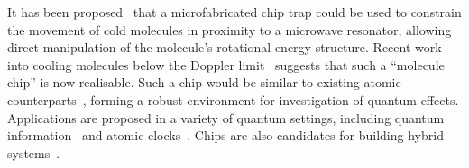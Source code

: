 
It has been proposed~\cite{Andre2006} that a microfabricated chip trap could be
used to constrain the movement of cold molecules in proximity to a microwave
resonator, allowing direct manipulation of the molecule's rotational energy
structure. Recent work into cooling molecules below the Doppler
limit~\cite{Truppe2017} suggests that such a ``molecule chip'' is now realisable.
Such a chip would be similar to existing atomic
counterparts~\cite{RevModPhys.79.235, 2011Ac}, forming a robust environment for
investigation of quantum effects. Applications are proposed in a variety of
quantum settings, including quantum information~\cite{Folman2000} and
atomic clocks~\cite{RAMIREZMARTINEZ2011247}. Chips are also candidates for
building hybrid systems~\cite{Nirrengarten2006}.

%
%
%


